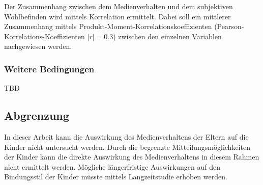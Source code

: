 Der Zusammenhang zwischen dem Medienverhalten und dem subjektiven Wohlbefinden wird mittels Korrelation ermittelt. Dabei soll ein mittlerer Zusammenhang mittels Produkt-Moment-Korrelationskoeffizienten (Pearson-Korrelations-Koeffizienten $|r|=0.3$) zwischen den einzelnen Variablen nachgewiesen werden.

\subsubsection{Weitere Bedingungen}
TBD
\subsection{Abgrenzung}
In dieser Arbeit kann die Auswirkung des Medienverhaltens der Eltern auf die Kinder nicht untersucht werden. Durch die begrenzte Mitteilungsmöglichkeiten der Kinder kann die direkte Auswirkung des Medienverhaltens in diesem Rahmen nicht ermittelt werden. Mögliche längerfristige Auswirkungen auf den Bindungsstil der Kinder müsste mittels Langzeitstudie erhoben werden. 
